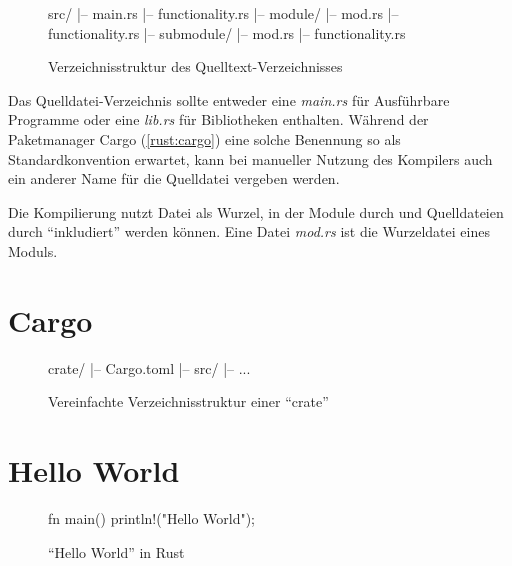 \begin{wrapfigure}{l}[-1em]{.4\textwidth}
	\begin{rustc}
		src/
		|-- main.rs
		|-- functionality.rs
		|-- module/
		    |-- mod.rs
		    |-- functionality.rs
		    |-- submodule/
		        |-- mod.rs
		        |-- functionality.rs
	\end{rustc}
	\caption{Verzeichnisstruktur des Quelltext-Verzeichnisses}
\end{wrapfigure}


Das Quelldatei-Verzeichnis sollte entweder eine \textit{main.rs} für Ausführbare Programme oder eine \textit{lib.rs} für Bibliotheken enthalten.
Während der Paketmanager Cargo (\autoref{rust:cargo}) eine solche Benennung so als Standardkonvention erwartet, kann bei manueller Nutzung des Kompilers auch ein anderer Name für die Quelldatei vergeben werden.

Die Kompilierung nutzt  Datei als Wurzel, in der Module durch  und Quelldateien durch  \enquote{inkludiert} werden können.
Eine Datei \textit{mod.rs} ist die Wurzeldatei eines Moduls. 

\section{Cargo}
\label{rust:cargo}

\begin{wrapfigure}{r}[-1em]{.4\textwidth}
	\hspace{1em}
	\begin{rustc}
		crate/
		|-- Cargo.toml
		|-- src/
		    |-- ...
	\end{rustc}
	\caption{Vereinfachte Verzeichnisstruktur einer \enquote{crate}}
\end{wrapfigure}


\section{Hello World}


\begin{wrapfigure}{l}{.5\textwidth}
	\begin{rustc}
		fn main() {
			println!("Hello World");
		}
	\end{rustc}
	\caption{\enquote{Hello World} in Rust}
	\label{fig:rust:hello_world}
\end{wrapfigure}

